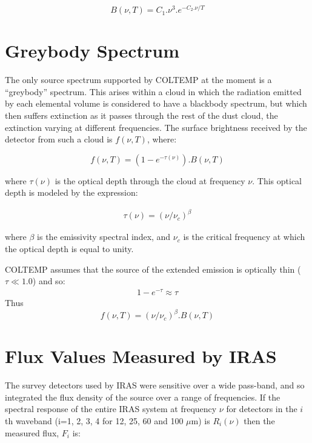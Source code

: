 \begin{equation}
B( \nu, T ) = C_{1}.\nu^{3}.e^{-C_{2}.\nu/T}
\end{equation}

\section{Greybody Spectrum}
The only source spectrum supported by {\small COLTEMP} at the moment is a
``greybody'' spectrum. This arises within a cloud in which the radiation emitted
by each elemental volume is considered to have a blackbody spectrum, but which
then suffers extinction as it passes through the rest of the dust cloud, the
extinction varying at different frequencies. The surface brightness received by
the detector from such a cloud is $f( \nu, T )$, where:

\begin{equation}
\label{EQ:FD}
f( \nu, T ) = (1-e^{-\tau(\nu)}).B( \nu, T )
\end{equation}

where $\tau(\nu)$ is the optical depth through the cloud at frequency $\nu$.
This optical depth is modeled by the expression:

\begin{eqnarray*}
\tau(\nu) = (\nu/\nu_{c})^{\beta}
\end{eqnarray*}

where $\beta$ is the emissivity spectral index, and $\nu_{c}$ is the critical
frequency at which the optical depth is equal to unity.

{\small COLTEMP} assumes that the source of the extended emission is optically
thin ($\tau \ll 1.0$) and so:
\begin{eqnarray*}
1-e^{-\tau} \approx \tau
\end{eqnarray*}
Thus
\begin{equation}
f( \nu, T ) = (\nu/\nu_{c})^{\beta}.B( \nu, T )
\end{equation}

\section{Flux Values Measured by IRAS}
The survey detectors used by {\small IRAS} were sensitive over a wide pass-band,
and so integrated the flux density of the source over a range of frequencies. If
the spectral response of the entire {\small IRAS} system at frequency $\nu$ for
detectors in the $i$th waveband (i=1, 2, 3, 4 for 12, 25, 60 and 100 $\mu$m) is
$R_{i}(\nu)$ then the measured flux, $F_{i}$ is:


